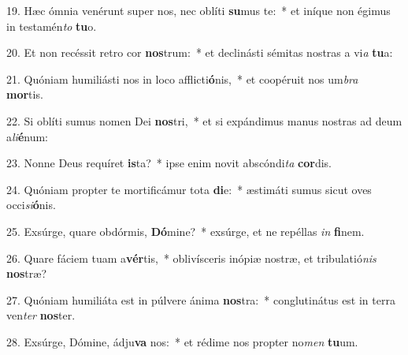 19. Hæc ómnia venérunt super nos, nec oblíti \textbf{su}mus te:~*  et iníque non égimus in testamén\textit{to} \textbf{tu}o.\

20. Et non recéssit retro cor \textbf{nos}trum:~*  et declinásti sémitas nostras a vi\textit{a} \textbf{tu}a:\

21. Quóniam humiliásti nos in loco afflicti\textbf{ó}nis,~*  et coopéruit nos um\textit{bra} \textbf{mor}tis.\

22. Si oblíti sumus nomen Dei \textbf{nos}tri,~*  et si expándimus manus nostras ad deum a\textit{li}\textbf{é}num:\

23. Nonne Deus requíret \textbf{is}ta?~*  ipse enim novit abscóndi\textit{ta} \textbf{cor}dis.\

24. Quóniam propter te mortificámur tota \textbf{di}e:~*  æstimáti sumus sicut oves occi\textit{si}\textbf{ó}nis.\

25. Exsúrge, quare obdórmis, \textbf{Dó}mine?~*  exsúrge, et ne repéllas \textit{in} \textbf{fi}nem.\

26. Quare fáciem tuam a\textbf{vér}tis,~*  oblivísceris inópiæ nostræ, et tribulatió\textit{nis} \textbf{nos}træ?\

27. Quóniam humiliáta est in púlvere ánima \textbf{nos}tra:~*  conglutinátus est in terra ven\textit{ter} \textbf{nos}ter.\

28. Exsúrge, Dómine, ádju\textbf{va} nos:~*  et rédime nos propter no\textit{men} \textbf{tu}um.\

